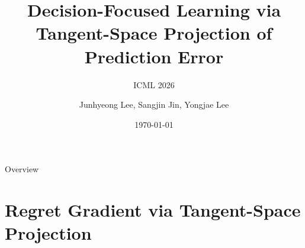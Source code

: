 \documentclass[10pt,aspectratio=169,xcolor=dvipsnames]{beamer}
\title{Decision-Focused Learning via Tangent-Space Projection of Prediction Error}
\subtitle{ICML 2026 \texorpdfstring{\citep{lee2026decisionfocusedlearningtangentspaceprojection}}{(Lee et al., 2026)}}
\author{Junhyeong Lee, Sangjin Jin, Yongjae Lee }
\institute
{
    Department of Industrial Engineering\\
    Ulsan National Institute of Science and Technology, Ulsan, South Korea.
}
\date{\today} %
\begin{document}
\begin{frame}
    \titlepage
\end{frame}

\begin{frame}{Overview}
    \tableofcontents
\end{frame}

\section{Regret Gradient via Tangent-Space  Projection}

\begin{frame}
    \sectionpage
\end{frame}
\end{document}
